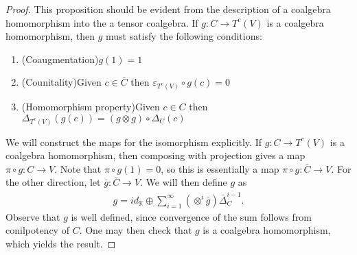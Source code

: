 \documentclass[../thesis.tex]{subfiles}
\begin{document}
            \begin{proof}
                This proposition should be evident from the description of a coalgebra homomorphism into the a tensor coalgebra. If $g:C\rightarrow T^c(V)$ is a coalgebra homomorphism, then $g$ must satisfy the following conditions:
                \begin{enumerate}
                    \item (Coaugmentation)\quad $g(1)=1$
                    \item (Counitality)\quad Given $c\in \bar{C}$ then $\varepsilon_{T^c(V)}\circ g(c)=0$
                    \item (Homomorphism property)\quad Given $c\in C$ then $\Delta_{T^c(V)}(g(c))=(g\otimes g)\circ\Delta_C(c)$
                \end{enumerate}

                We will construct the maps for the isomorphism explicitly. If $g:C\rightarrow T^c(V)$ is a coalgebra homomorphism, then composing with projection gives a map $\pi\circ g:C\rightarrow V$. Note that $\pi\circ g(1)=0$, so this is essentially a map $\pi\circ g:\bar{C}\rightarrow V$. For the other direction, let $\bar{g}:\bar{C}\rightarrow V$. We will then define $g$ as
                \begin{align*}
                    g = id_{\mathbb{K}} \oplus \sum_{i=1}^{\infty}(\otimes^{i}\bar{g})\bar{\Delta}_C^{i-1}.
                \end{align*}
                Observe that $g$ is well defined, since convergence of the sum follows from conilpotency of $C$. One may then check that $g$ is a coalgebra homomorphism, which yields the result.
            \end{proof}
\end{document}

